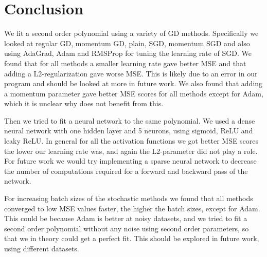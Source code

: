 \section{Conclusion}

We fit a second order polynomial using a variety of GD methods. Specifically we
looked at regular GD, momentum GD, plain, SGD, momentum SGD and also using AdaGrad, Adam 
and RMSProp for tuning the learning rate of SGD. We found that for all methods
a smaller learning rate gave better MSE and that adding a L2-regularization
gave worse MSE. This is likely due to an error in our program and should be
looked at more in future work. We also found that adding a momentum parameter
gave better MSE scores for all methods except for Adam, which it is unclear why
does not benefit from this.



Then we tried to fit a neural network to the same polynomial. We used a dense
neural network with one hidden layer and 5 neurons, using sigmoid, ReLU and
leaky ReLU. In general for all the activation functions we got better MSE
scores the lower our learning rate was, and again the L2-parameter did not play
a role. For future work we would try implementing a sparse neural network to
decrease the number of computations required for a forward and backward pass of
the network. 

For increasing batch sizes of the stochastic methods we found that all methods
converged to low MSE values faster, the higher the batch sizes, except for
Adam. This could be because Adam is better at noisy datasets, and we tried to
fit a second order polynomial without any noise using second order parameters,
so that we in theory could get a perfect fit. This should be explored in future
work, using different datasets.



